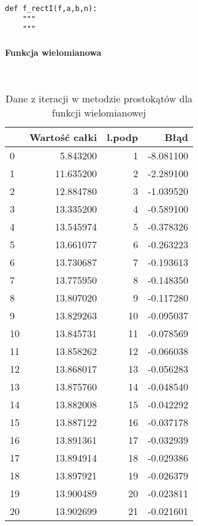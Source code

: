 \documentclass[12pt,twoside]{article}
\begin{document}
\begin{lstlisting}[caption={Kod w języku python implementujący metodę prostokątów}]
def f_rectI(f,a,b,n):
    """
    """
\end{lstlisting}
\label{Listing 6}


\paragraph{Funkcja wielomianowa}\mbox{} \\

\begin{table}[H]
\centering 
\caption{Dane z iteracji w metodzie prostokątów dla funkcji wielomianowej}
\label{tabela1.1}
\begin{tabular}{lrrr}
\toprule
{} &  Wartość całki &  l.podp &      Błąd \\
\midrule
0  &       5.843200 &       1 & -8.081100 \\
1  &      11.635200 &       2 & -2.289100 \\
2  &      12.884780 &       3 & -1.039520 \\
3  &      13.335200 &       4 & -0.589100 \\
4  &      13.545974 &       5 & -0.378326 \\
5  &      13.661077 &       6 & -0.263223 \\
6  &      13.730687 &       7 & -0.193613 \\
7  &      13.775950 &       8 & -0.148350 \\
8  &      13.807020 &       9 & -0.117280 \\
9  &      13.829263 &      10 & -0.095037 \\
10 &      13.845731 &      11 & -0.078569 \\
11 &      13.858262 &      12 & -0.066038 \\
12 &      13.868017 &      13 & -0.056283 \\
13 &      13.875760 &      14 & -0.048540 \\
14 &      13.882008 &      15 & -0.042292 \\
15 &      13.887122 &      16 & -0.037178 \\
16 &      13.891361 &      17 & -0.032939 \\
17 &      13.894914 &      18 & -0.029386 \\
18 &      13.897921 &      19 & -0.026379 \\
19 &      13.900489 &      20 & -0.023811 \\
20 &      13.902699 &      21 & -0.021601 \\

\end{tabular}
\end{table}
\end{document}
